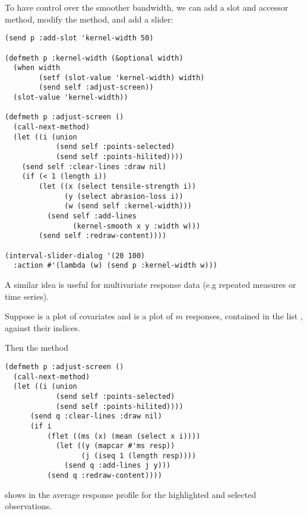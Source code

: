 \begin{slide}{}
To have control over the smoother bandwidth, we can add a slot and
accessor method, modify the  method, and add
a slider:
{\large
\begin{verbatim}
(send p :add-slot 'kernel-width 50)

(defmeth p :kernel-width (&optional width)
  (when width
        (setf (slot-value 'kernel-width) width)
        (send self :adjust-screen))
  (slot-value 'kernel-width))

(defmeth p :adjust-screen ()
  (call-next-method)
  (let ((i (union
            (send self :points-selected)
            (send self :points-hilited))))
    (send self :clear-lines :draw nil)
    (if (< 1 (length i))
        (let ((x (select tensile-strength i))
              (y (select abrasion-loss i))
              (w (send self :kernel-width)))
          (send self :add-lines
                (kernel-smooth x y :width w)))
        (send self :redraw-content))))

(interval-slider-dialog '(20 100)
  :action #'(lambda (w) (send p :kernel-width w)))
\end{verbatim}}
\end{slide}

\begin{slide}{}
A similar idea is useful for multivariate response data (e.g
repeated measures or time series).

Suppose  is a plot of covariates and  is a
plot of $m$ responses, contained in the list , against
their indices.

Then the method
{\Large
\begin{verbatim}
(defmeth p :adjust-screen ()
  (call-next-method)
  (let ((i (union
            (send self :points-selected)
            (send self :points-hilited))))
      (send q :clear-lines :draw nil)
      (if i
          (flet ((ms (x) (mean (select x i))))
            (let ((y (mapcar #'ms resp))
                  (j (iseq 1 (length resp))))
              (send q :add-lines j y)))
          (send q :redraw-content))))
\end{verbatim}}
shows in  the average response profile for the highlighted
and selected observations.
\end{slide}

